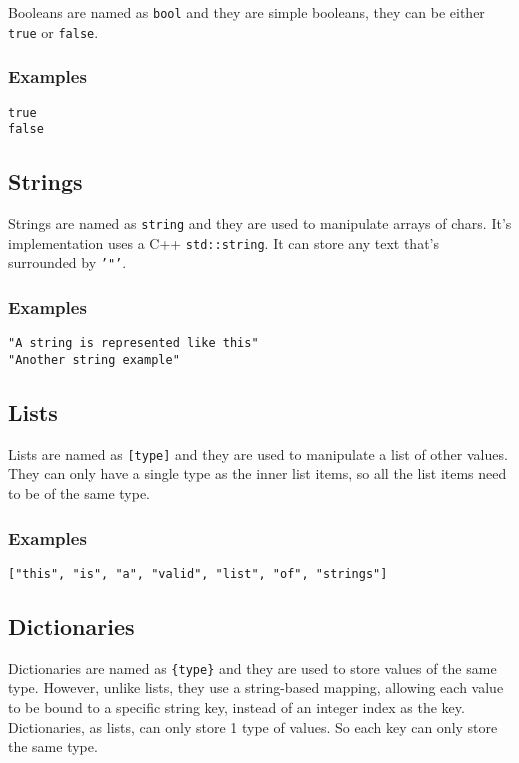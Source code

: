 Booleans are named as \texttt{bool} and they are simple booleans, they can be either \texttt{true} or \texttt{false}.

\subsubsection{Examples}

\begin{lstlisting}
true
false
\end{lstlisting}

\subsection{Strings}

Strings are named as \texttt{string} and they are used to manipulate arrays of chars. It's implementation uses
a C++ \texttt{std::string}. It can store any text that's surrounded by \texttt{'"'}.

\subsubsection{Examples}

\begin{lstlisting}
"A string is represented like this"
"Another string example"
\end{lstlisting}

\subsection{Lists}

Lists are named as \texttt{[type]} and they are used to manipulate a list of other values. They can only have a single
type as the inner list items, so all the list items need to be of the same type.

\subsubsection{Examples}

\begin{lstlisting}
["this", "is", "a", "valid", "list", "of", "strings"]
\end{lstlisting}

\subsection{Dictionaries}

Dictionaries are named as \texttt{\{type\}} and they are used to store values of the same type. However, unlike lists, they
use a string-based mapping, allowing each value to be bound to a specific string key, instead of an integer index as the key.
Dictionaries, as lists, can only store 1 type of values. So each key can only store the same type.

